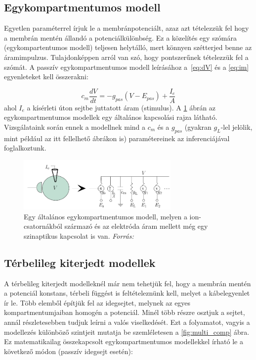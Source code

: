 \subsection{Egykompartmentumos modell}\label{sec:single-comp}
Egyetlen paraméterrel írjuk le a membránpotenciált, azaz azt tételezzük fel hogy a membrán mentén állandó a potenciálkülönbség. Ez a közelítés egy szómára (egykompartentumos modell) teljesen helytálló, mert könnyen szétterjed benne az áramimpulzus. Tulajdonképpen arról van szó, hogy pontszerűnek tételezzük fel a szómát.
A passzív egykompartmentumos modell leírásához a~\ref{eq:dV} és a \ref{eq:im} egyenleteket kell összerakni:

\begin{equation}\label{eq:one_comp}
	c_m \dfrac{dV}{dt} = -g_{pas} \left( V-E_{pas} \right) + \dfrac{I_e}{A}
\end{equation}
ahol $I_e$ a kísérleti úton sejtbe juttatott áram (stimulus). A \ref{fig:single_comp} ábrán az egykompartmentumos modellek egy általános kapcsolási rajza látható. Vizsgálataink során ennek a modellnek mind a $c_m$ és a $g_{pas}$ (gyakran $g_L$-lel jelölik, mint például az itt fellelhető ábrákon is) paramétereinek az inferenciájával foglalkoztunk.

\begin{figure}[h!]
	\centering
	\includegraphics[width=0.7\textwidth]{./fig/single-compartment.png}
	\caption[Egykompartmentumos modell]{Egy általános egykompartmentumos modell, melyen a ion-csatornákból származó és az elektróda áram mellett még egy szinaptikus kapcsolat is van. \textit{Forrás:}\cite{dayan2001theoretical} }
	\label{fig:single_comp}
\end{figure}













\subsection{Térbelileg kiterjedt modellek}\label{sec:multi-comp}
A térbelileg kiterjedt modelleknél már nem tehetjük fel, hogy a membrán mentén a potenciál konstans, térbeli függést is feltételeznünk kell, melyet a kábelegyenlet ír le. Több elemből építjük fel az idegsejtet, melynek az egyes kompartmentumjaiban homogén a potenciál. Minél több részre osztjuk a sejtet, annál részletesebben tudjuk leírni a valós viselkedését. Ezt a folyamatot, vagyis a modellezés különböző szintjeit mutatja be szemléletesen a \ref{fig:multi_comp} ábra. Ez matematikailag összekapcsolt egykompartmentumos modellekkel írható le a következő módon (passzív idegsejt esetén):

